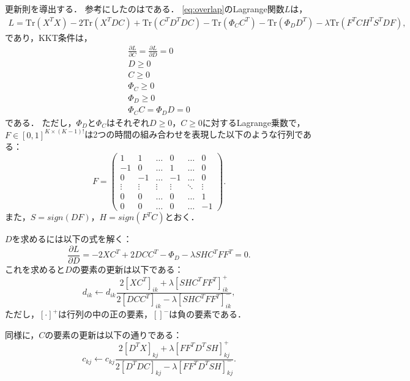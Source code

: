 更新則を導出する．
参考にしたのは\cite{Babaee2016}である．
\eqref{eq:overlap}のLagrange関数$L$は，
\begin{eqnarray}
	L = \text{Tr}(X^TX) - 2 \text{Tr}(X^TDC) + \text{Tr}(C^TD^TDC) - \text{Tr}(\Phi_C C^T) - \text{Tr}(\Phi_D D^T) - \lambda \text{Tr} (F^T C H^T S^T D F),
\end{eqnarray}
であり，KKT条件は，
\begin{eqnarray}
	\frac{\partial L}{\partial C} = \frac{\partial L}{\partial D} = 0 \\
	D \geq 0 \\
	C \geq 0 \\
	\Phi_C \geq 0 \\
	\Phi_D \geq 0 \\
	\Phi_C C = \Phi_D D = 0
\end{eqnarray}
である．
ただし，$\Phi_D$と$\Phi_C$はそれぞれ$D \geq 0$，$C \geq 0$に対するLagrange乗数で，$F \in [0,1]^{K \times (K-1)!}$は2つの時間の組み合わせを表現した以下のような行列である：
\begin{equation}
	F = \left(
    \begin{array}{cccccc}
			1 & 1 & \ldots & 0 & \ldots & 0 \\
			-1 & 0 & \ldots & 1 & \ldots & 0 \\
			0 & -1 & \ldots & -1 & \ldots & 0 \\
			\vdots & \vdots & \vdots & \vdots & \ddots & \vdots \\
			0 & 0 & \ldots & 0 & \ldots & 1 \\
			0 & 0 & \ldots & 0 & \ldots & -1
    \end{array}
  \right).
\end{equation}
また，$S = sign(DF)$，$H = sign(F^TC)$とおく．

$D$を求めるには以下の式を解く：
\begin{equation}
	\frac{\partial L}{\partial D} = - 2 X C^T + 2 DCC^T - \Phi_D - \lambda SHC^T FF^T = 0.
\end{equation}
これを求めると$D$の要素の更新は以下である：
\begin{equation}
	d_{ik} \leftarrow d_{ik} \frac{2[XC^T]_{ik} + \lambda [SHC^T FF^T]_{ik}^+}{2[DCC^T]_{ik} - \lambda [SHC^T FF^T]_{ik}^-},
\end{equation}
ただし，$[\cdot]^+$は行列の中の正の要素，$[]^-$は負の要素である．

同様に，$C$の要素の更新は以下の通りである：
\begin{equation}
	c_{kj} \leftarrow c_{kj} \frac{2[D^T X]_{kj} + \lambda [FF^T D^T SH]_{kj}^+}{2[D^T DC]_{kj} - \lambda [FF^T D^T SH]_{kj}^-}.
\end{equation}

